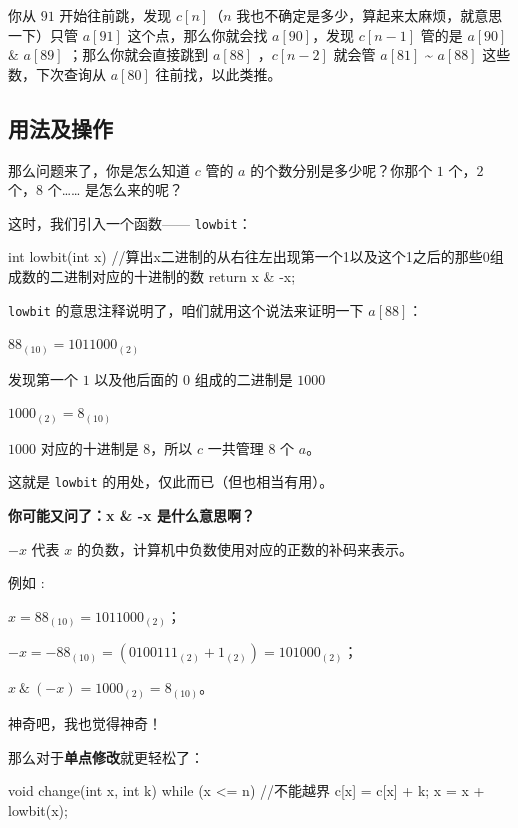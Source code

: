 你从 $91$ 开始往前跳，发现 $c[n]$（$n$ 我也不确定是多少，算起来太麻烦，就意思一下）只管 $a[91]$ 这个点，那么你就会找 $a[90]$，发现 $c[n - 1]$ 管的是 $a[90]$ \& $a[89]$ ；那么你就会直接跳到 $a[88]$ ，$c[n - 2]$ 就会管 $a[81]$ \textasciitilde{} $a[88]$ 这些数，下次查询从 $a[80]$ 往前找，以此类推。

\hr

\subsection{用法及操作}

那么问题来了，你是怎么知道 $c$ 管的 $a$ 的个数分别是多少呢？你那个 $1$ 个，$2$ 个，$8$ 个…… 是怎么来的呢？

这时，我们引入一个函数—— \texttt{lowbit}：

\begin{cppcode}
int lowbit(int x) {
  //算出x二进制的从右往左出现第一个1以及这个1之后的那些0组成数的二进制对应的十进制的数
  return x & -x;
}
\end{cppcode}

\texttt{lowbit} 的意思注释说明了，咱们就用这个说法来证明一下 $a[88]$：  

$88_{(10)}=1011000_{(2)}$  

发现第一个 $1$ 以及他后面的 $0$ 组成的二进制是 $1000$  

$1000_{(2)} = 8_{(10)}$  

$1000$ 对应的十进制是 $8$，所以 $c$ 一共管理 $8$ 个 $a$。

这就是 \texttt{lowbit} 的用处，仅此而已（但也相当有用）。

\textbf{你可能又问了：x \& -x 是什么意思啊？}

\begin{QUOTE}{}{}
$-x$ 代表 $x$ 的负数，计算机中负数使用对应的正数的补码来表示。
\end{QUOTE}

例如 :  

$x =88_{(10)}=1011000_{(2)}$；  

$-x = -88_{(10)} = (0100111_{(2)} + 1_{(2)}) =101000_{(2)}$；  

$x\ \& \ (-x) = 1000_{(2)} = 8_{(10)}$。

神奇吧，我也觉得神奇！

那么对于\textbf{单点修改}就更轻松了：

\begin{cppcode}
void change(int x, int k) {
  while (x <= n)  //不能越界
  {
    c[x] = c[x] + k;
    x = x + lowbit(x);
  }
}
\end{cppcode}

